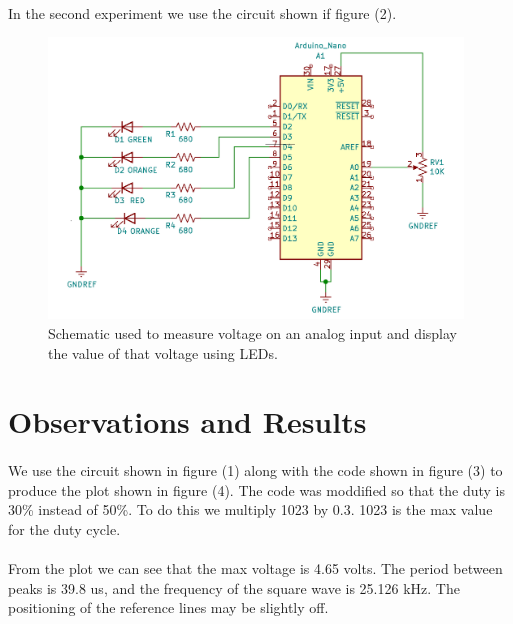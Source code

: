 \documentclass{article}
\begin{document}
\paragraph{}
In the second experiment we use the circuit shown if figure (2).

\begin{figure}[H]
	\begin{center}
	\includegraphics[width=11cm]{lab_3_schematic_4_led}
	\end{center}
	\caption{Schematic used to measure voltage on an analog input and display the value of that voltage using LEDs.}
\end{figure}

\section{Observations and Results}

\paragraph{}
We use the circuit shown in figure (1) along with the code shown in figure (3) to produce the plot shown in figure (4). The code was moddified so that the duty is 30\% instead of 50\%. To do this we multiply 1023 by 0.3. 1023 is the max value for the duty cycle.

\paragraph{}
From the plot we can see that the max voltage is 4.65 volts. The period between peaks is 39.8 us, and the frequency of the square wave is 25.126 kHz. The positioning of the reference lines may be slightly off.
\end{document}

